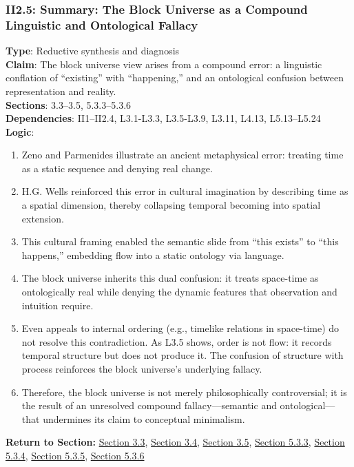 \documentclass[12pt]{book}
\begin{document}
\subsubsection*{II2.5: Summary: The Block Universe as a Compound Linguistic and Ontological Fallacy}
\label{appendix:II2.5}
\textbf{Type}: Reductive synthesis and diagnosis\\
\textbf{Claim}: The block universe view arises from a compound error: a linguistic conflation of ``existing'' with ``happening,'' and an ontological confusion between representation and reality.\\
\textbf{Sections}: 3.3–3.5, 5.3.3–5.3.6\\
\textbf{Dependencies}: II1–II2.4, L3.1-L3.3, L3.5-L3.9, L3.11, L4.13, L5.13–L5.24\\
\textbf{Logic}:
\begin{enumerate}
    \item Zeno and Parmenides illustrate an ancient metaphysical error: treating time as a static sequence and denying real change.
    \item H.G. Wells reinforced this error in cultural imagination by describing time as a spatial dimension, thereby collapsing temporal becoming into spatial extension.
    \item This cultural framing enabled the semantic slide from ``this exists'' to ``this happens,'' embedding flow into a static ontology via language.
    \item The block universe inherits this dual confusion: it treats space-time as ontologically real while denying the dynamic features that observation and intuition require.
    \item Even appeals to internal ordering (e.g., timelike relations in space-time) do not resolve this contradiction. As L3.5 shows, order is not flow: it records temporal structure but does not produce it. The confusion of structure with process reinforces the block universe's underlying fallacy.
    \item Therefore, the block universe is not merely philosophically controversial; it is the result of an unresolved compound fallacy---semantic and ontological---that undermines its claim to conceptual minimalism.
\end{enumerate}
\textbf{Return to Section:} \hyperref[sec:3.3]{Section 3.3}, \hyperref[sec:3.4]{Section 3.4}, \hyperref[sec:3.5]{Section 3.5}, \hyperref[sec:5.3.3]{Section 5.3.3}, \hyperref[sec:5.3.4]{Section 5.3.4}, \hyperref[sec:5.3.5]{Section 5.3.5}, \hyperref[sec:5.3.6]{Section 5.3.6}
\end{document}
